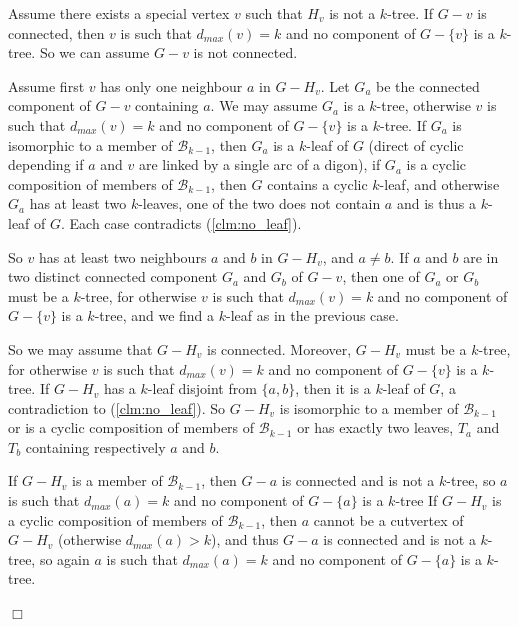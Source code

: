 \documentclass[11pt]{article}
\newcounter{claim}
\newenvironment{proof}[1][]%
 {\noindent {\setcounter{claim}{0}\sc proof ---
   }{#1}{}}{\hfill$\Box$\vspace{2ex}}
\begin{document}
\begin{proof}
Assume there exists a special vertex $v$ such that $H_v$ is not a $k$-tree. 
If $G-v$ is connected, then $v$ is such that $d_{max}(v) = k$ and no component of $G - \{ v \}$ is a $k$-tree. 
So we can assume $G-v$ is not connected. 

Assume first $v$ has only one neighbour $a$ in $G-H_v$. Let $G_a$ be the connected component of $G-v$ containing $a$. We may assume  $G_a$ is a $k$-tree, otherwise $v$ is such that $d_{max}(v) = k$ and no component of $G - \{ v \}$ is a $k$-tree.  
If $G_a$ is isomorphic to a member of $\mathcal B_{k-1}$, then $G_a$ is a $k$-leaf of $G$ (direct of cyclic depending if $a$ and $v$ are linked by a single arc of a digon), if $G_a$ is a cyclic composition of members of $\mathcal B_{k-1}$, then $G$ contains a cyclic $k$-leaf, and otherwise $G_a$ has at least two $k$-leaves, one of the two does not contain $a$ and is thus a $k$-leaf of $G$. Each case contradicts (\ref{clm:no_leaf}).


So $v$ has at least two neighbours $a$ and $b$ in $G-H_v$, and $a \neq b$. 
If $a$ and $b$ are in two distinct connected component $G_a$ and $G_b$ of $G-v$, then one of $G_a$ or $G_b$ must be a $k$-tree, for otherwise $v$ is such that $d_{max}(v) = k$ and no component of $G - \{ v \}$ is a $k$-tree, and we find a $k$-leaf as in the previous case.

So we may assume that $G-H_v$ is connected. 
Moreover, $G-H_v$ must be a $k$-tree, for otherwise $v$ is such that $d_{max}(v) = k$ and no component of $G - \{ v \}$ is a $k$-tree.
If $G-H_v$ has a $k$-leaf disjoint from $\{a,b\}$, then it is a $k$-leaf of $G$, a contradiction to (\ref{clm:no_leaf}). So $G-H_v$ is isomorphic to a member of $\mathcal B_{k-1}$ or is a cyclic composition of members of $\mathcal B_{k-1}$ or has exactly two leaves, $T_a$ and $T_b$ containing respectively $a$ and $b$. 

If $G-H_v$ is a member of $\mathcal B_{k-1}$, then $G-a$ is connected and is not a $k$-tree, so $a$ is such that $d_{max}(a) = k$ and no component of $G - \{ a \}$ is a $k$-tree 
If $G-H_v$ is a cyclic composition of members of $\mathcal B_{k-1}$, then $a$ cannot be a cutvertex of $G-H_v$ (otherwise $d_{max}(a)>k$), and thus $G-a$ is connected and is not a $k$-tree, so again $a$ is such that $d_{max}(a) = k$ and no component of $G - \{ a \}$ is a $k$-tree. 


\end{proof}
\end{document}

